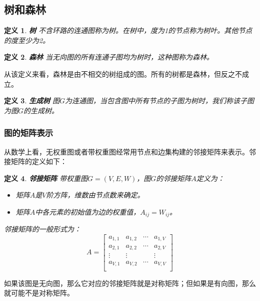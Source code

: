 \documentclass{ctexart}
\newtheorem{Definition}{\hspace{2em}定义}[section]
\begin{document}
            \subsection{树和森林}
                \begin{Definition}
                    \textbf{树} 不含环路的连通图称为树。在树中，度为1的节点称为树叶。其他节点的度至少为2。
                \end{Definition}
                \begin{Definition}
                    \textbf{森林} 当无向图的所有连通子图均为树时，这种图称为森林。
                \end{Definition}
                从该定义来看，森林是由不相交的树组成的图。所有的树都是森林，但反之不成立。
                \begin{Definition}
                    \textbf{生成树} 图$G$为连通图，当包含图中所有节点的子图为树时，我们称该子图为图$G$的生成树。
                \end{Definition}
            \subsubsection{图的矩阵表示}
                从数学上看，无权重图或者带权重图经常用节点和边集构建的邻接矩阵来表示。邻接矩阵的定义如下：
                \begin{Definition}
                    \textbf{邻接矩阵} 带权重图$G=(V,E,W)$，图$G$的邻接矩阵$A$定义为：
                    \begin{itemize}
                      \item 矩阵$A$是$V$阶方阵，维数由节点数来确定。
                      \item 矩阵$A$中各元素的初始值为边的权重值，$A_{ij} = W_{ij}$。
                    \end{itemize}
                    邻接矩阵的一般形式为：
                    \begin{equation}
                        A = \left [
                            \begin{array}{cccc}
                                a_{1,1} & a_{1,2} & \cdots & a_{1,V} \\
                                a_{2,1} & a_{2,2} & \cdots & a_{2,V} \\
                                \vdots & \vdots & & \vdots \\
                                a_{V,1}& a_{V,2} & \cdots & a_{V,V} \\
                            \end{array}
                        \right ]
                    \end{equation}
                \end{Definition}
                如果该图是无向图，那么它对应的邻接矩阵就是对称矩阵；但如果是有向图，那么就可能不是对称矩阵。
\end{document}
